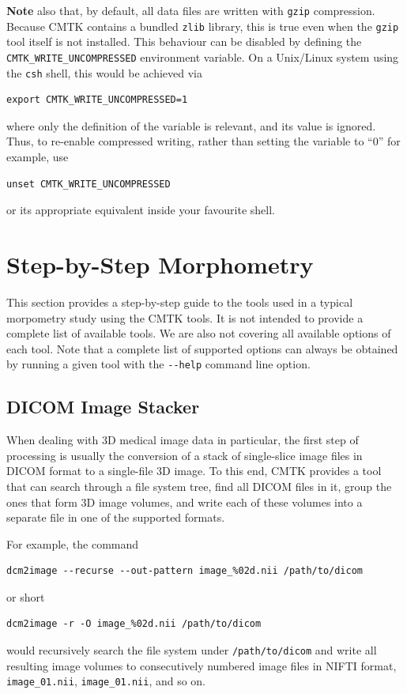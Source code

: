\documentclass{InsightArticle}
\begin{document}
{\bf Note} also that, by default, all data files are written with \verb|gzip|
compression. Because CMTK contains a bundled \verb|zlib| library, this is true
even when the \verb|gzip| tool itself is not installed. This behaviour can be
disabled by defining the \verb|CMTK_WRITE_UNCOMPRESSED| environment
variable. On a Unix/Linux system using the \verb|csh| shell, this would be
achieved via
\begin{verbatim}
export CMTK_WRITE_UNCOMPRESSED=1
\end{verbatim}
where only the definition of the variable is relevant, and its value is
ignored. Thus, to re-enable compressed writing, rather than setting the
variable to ``0'' for example, use
\begin{verbatim}
unset CMTK_WRITE_UNCOMPRESSED
\end{verbatim}
or its appropriate equivalent inside your favourite shell.

\section{Step-by-Step Morphometry}

This section provides a step-by-step guide to the tools used in a typical
morpometry study using the CMTK tools. It is not intended to provide a
complete list of available tools. We are also not covering all available
options of each tool. Note that a complete list of supported options can
always be obtained by running a given tool with the \verb|--help| command line
option.

\subsection{DICOM Image Stacker}

When dealing with 3D medical image data in particular, the first step of
processing is usually the conversion of a stack of single-slice image files in
DICOM format to a single-file 3D image. To this end, CMTK provides a tool that
can search through a file system tree, find all DICOM files in it, group the
ones that form 3D image volumes, and write each of these volumes into a
separate file in one of the supported formats.

For example, the command
\begin{verbatim}
dcm2image --recurse --out-pattern image_%02d.nii /path/to/dicom
\end{verbatim}
or short
\begin{verbatim}
dcm2image -r -O image_%02d.nii /path/to/dicom
\end{verbatim}
would recursively search the file system under {\tt /path/to/dicom} and write
all resulting image volumes to consecutively numbered image files in NIFTI
format, {\tt image\_01.nii},  {\tt image\_01.nii}, and so on.
\end{document}

